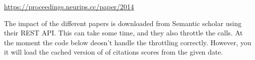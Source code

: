\begin{Shaded}
\begin{Highlighting}[]
\end{Highlighting}
\end{Shaded}

\begin{Shaded}
\begin{Highlighting}[]
\end{Highlighting}
\end{Shaded}

\begin{Shaded}
\begin{Highlighting}[]
\OperatorTok{=}
\end{Highlighting}
\end{Shaded}

\url{https://proceedings.neurips.cc/paper/2014}

\begin{Shaded}
\begin{Highlighting}[]
\OperatorTok{=}  
\end{Highlighting}
\end{Shaded}

The impact of the different papers is downloaded from Semantic scholar
using their REST API. This can take some time, and they also throttle
the calls. At the moment the code below deosn't handle the throttling
correctly. However, you it will load the cached version of of citations
scores from the given date.

\begin{Shaded}
\begin{Highlighting}[]
\OperatorTok{=}\StringTok{\textquotesingle{}}\NormalTok{)}
\NormalTok{:}
\OperatorTok{=} 
\end{Highlighting}
\end{Shaded}

